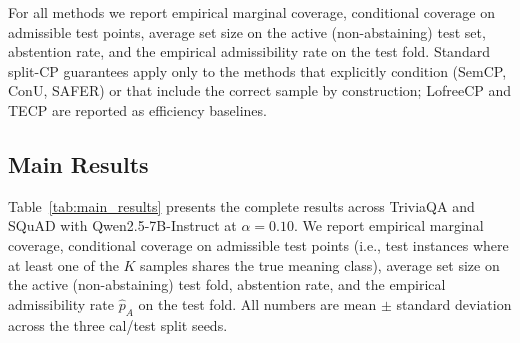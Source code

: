 \documentclass{article}
\begin{document}
For all methods we report empirical marginal coverage, conditional coverage on admissible test points, average set size on the active (non-abstaining) test set, abstention rate, and the empirical admissibility rate on the test fold. Standard split-CP guarantees apply only to the methods that explicitly condition (SemCP, ConU, SAFER) or that include the correct sample by construction; LofreeCP and TECP are reported as efficiency baselines.

\subsection{Main Results}

\label{sec:main_results}

Table~\ref{tab:main_results} presents the complete results across TriviaQA and SQuAD with Qwen2.5-7B-Instruct at $\alpha = 0.10$. We report empirical marginal coverage, conditional coverage on admissible test points (i.e., test instances where at least one of the $K$ samples shares the true meaning class), average set size on the active (non-abstaining) test fold, abstention rate, and the empirical admissibility rate $\hat{p}_A$ on the test fold. All numbers are mean $\pm$ standard deviation across the three cal/test split seeds.
\end{document}
